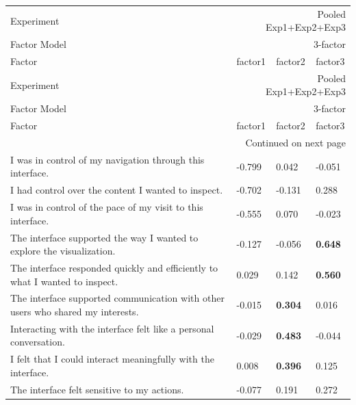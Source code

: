 \begin{longtable}{llll}
\toprule
Experiment & \multicolumn{3}{r}{Pooled Exp1+Exp2+Exp3} \\
Factor Model & \multicolumn{3}{r}{3-factor} \\
Factor & factor1 & factor2 & factor3 \\
\midrule
\endfirsthead
\toprule
Experiment & \multicolumn{3}{r}{Pooled Exp1+Exp2+Exp3} \\
Factor Model & \multicolumn{3}{r}{3-factor} \\
Factor & factor1 & factor2 & factor3 \\
\midrule
\endhead
\midrule
\multicolumn{4}{r}{Continued on next page} \\
\midrule
\endfoot
\bottomrule
\endlastfoot
I was in control of my navigation through this interface. & -0.799 & 0.042 & -0.051 \\
I had control over the content I wanted to inspect. & -0.702 & -0.131 & 0.288 \\
I was in control of the pace of my visit to this interface. & -0.555 & 0.070 & -0.023 \\
The interface supported the way I wanted to explore the visualization. & -0.127 & -0.056 & \textbf{0.648} \\
The interface responded quickly and efficiently to what I wanted to inspect. & 0.029 & 0.142 & \textbf{0.560} \\
The interface supported communication with other users who shared my interests. & -0.015 & \textbf{0.304} & 0.016 \\
Interacting with the interface felt like a personal conversation. & -0.029 & \textbf{0.483} & -0.044 \\
I felt that I could interact meaningfully with the interface. & 0.008 & \textbf{0.396} & 0.125 \\
The interface felt sensitive to my actions. & -0.077 & 0.191 & 0.272 \\
\end{longtable}
